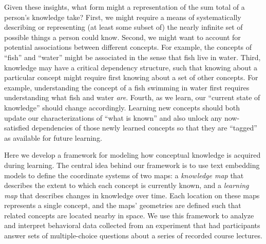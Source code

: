 \documentclass[10pt]{article}
\begin{document}
Given these insights, what form might a representation of the sum total of a
person's knowledge take? First, we might require a means of
systematically describing or representing (at least some subset of) the nearly infinite set of possible
things a person could know. Second, we might want to account for potential
associations between different concepts. For example, the concepts of ``fish''
and ``water'' might be associated in the sense that fish live in water. Third,
knowledge may have a critical dependency structure, such that knowing about a
particular concept might require first knowing about a set of other concepts.
For example, understanding the concept of a fish swimming in water first
requires understanding what fish and water \textit{are}. Fourth, as we learn,
our ``current state of knowledge'' should change accordingly. Learning new
concepts should both update our characterizations of ``what is known'' and also
unlock any now-satisfied dependencies of those newly learned concepts so that
they are ``tagged'' as available for future learning.

Here we develop a framework for modeling how conceptual knowledge is acquired
during learning. The central idea behind our framework is to use text embedding
models to define the coordinate systems of two maps: a \textit{knowledge
map} that describes the extent to which each concept is currently known, and
a \textit{learning map} that describes changes in knowledge over time. Each
location on these maps represents a single concept, and the maps' geometries
are defined such that related concepts are located nearby in space. We use this
framework to analyze and interpret behavioral data collected from an experiment
that had participants answer sets of multiple-choice questions about a series of
recorded course lectures.
\end{document}
